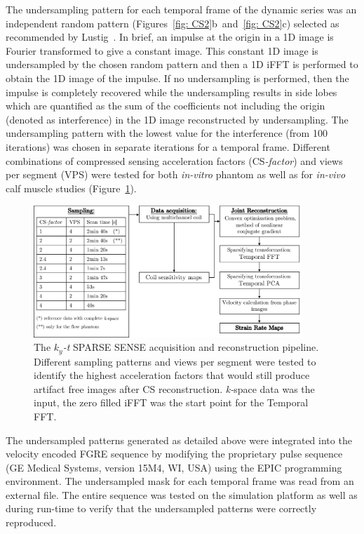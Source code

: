 The undersampling pattern for each temporal frame of the dynamic series was an independent random pattern (Figures~\ref{fig: CS2}b~and~\ref{fig: CS2}c) selected as recommended by Lustig~\cite{Lustig:2007cua}. 
In brief, an impulse at the origin in a 1D image is Fourier transformed to give a constant image. 
This constant 1D image is undersampled by the chosen random pattern and then a 1D iFFT is performed to obtain the 1D image of the impulse. 
If no undersampling is performed, then the impulse is completely recovered while the undersampling results in side lobes which are quantified as the sum of the coefficients not including the origin (denoted as interference) in the 1D image reconstructed by undersampling. 
The undersampling pattern with the lowest value for the interference (from 100 iterations) was chosen in separate iterations for a temporal frame. 
Different combinations of compressed sensing acceleration factors (\mbox{CS\textit{-factor}}) and views per segment (VPS) were tested for both \textit{in-vitro} phantom as well as for \textit{in-vivo} calf muscle studies (Figure~\ref{fig: CS3}).
\begin{figure}[!htb]
\vspace{+0.2cm}
\centering
\includegraphics[width=0.9\textwidth]{Figures/CS1_2.pdf}
\caption[The $k_y$\textit{-t} SPARSE SENSE acquisition and reconstruction pipeline]{The $k_y$\textit{-t} SPARSE SENSE acquisition and reconstruction pipeline. Different sampling patterns and views per segment were tested to identify the highest acceleration factors that would still produce artifact free images after CS reconstruction. \mbox{\textit{k-}space} data was the input, the zero filled iFFT was the start point for the Temporal FFT.}
\label{fig: CS3}
\end{figure}
The undersampled patterns generated as detailed above were integrated into the velocity encoded FGRE sequence by modifying the proprietary pulse sequence (GE Medical Systems, version 15M4, WI, USA) using the EPIC programming environment. 
The undersampled mask for each temporal frame was read from an external file. 
The entire sequence was tested on the simulation platform as well as during run-time to verify that the undersampled patterns were correctly reproduced.


